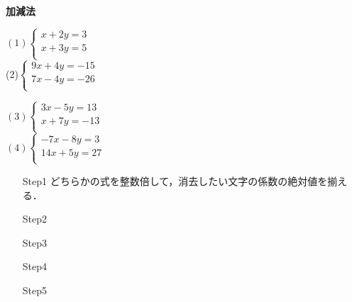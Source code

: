 \documentclass[b4paper,16.5pt,paparesize, landscape]{ltjsarticle}%
\begin{document}
{\textbf{\Large{加減法}}}\hspace{\fill}{\scalebox{1.5}{（　）組（　　　　　　　　）}}\\
\begin{multicols*}{3}
$(1)\begin{cases}
			x + 2y  = 3\\
			x + 3y = 5\\
\end{cases}$ 	\\[82mm]
(2)$\begin{cases}
			9x + 4y = -15\\
			7x - 4y = -26\\
\end{cases}$\vfill\null\columnbreak

$(3)\begin{cases}
			3x  - 5y = 13\\
			x + 7y = -13\\
\end{cases}$ 	\\[82mm]
$(4)\begin{cases}
				-7x - 8y = 3\\
				14x + 5y = 27\\
\end{cases}$
 \vfill\null\columnbreak
 \begin{enumerate}
	 \item[Step1]
		どちらかの式を整数倍して，消去したい文字の係数の絶対値を揃える．\\
	 \item[Step2]
	 \item[Step3]
	 \item[Step4]
	 \item[Step5]
 \end{enumerate}


\end{multicols*}
\end{document}
